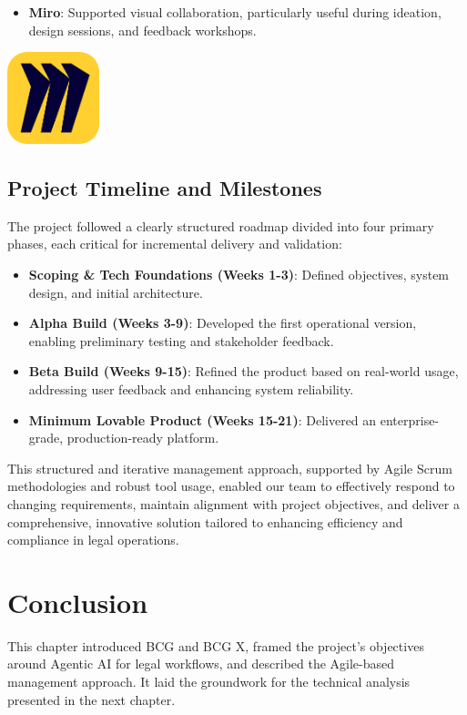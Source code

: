 \begin{itemize}
    \item \textbf{Miro}: Supported visual collaboration, particularly useful during ideation, design sessions, and feedback workshops.
\end{itemize}

\begin{center}
    \centering
    \includegraphics[width=0.2\textwidth]{Images/Miro Logo.png}
     \cite{miro_logo}
    \label{fig:miro_logo}
\end{center}

\subsection{Project Timeline and Milestones}
The project followed a clearly structured roadmap divided into four primary phases, each critical for incremental delivery and validation:

\begin{itemize}
    \item \textbf{Scoping \& Tech Foundations (Weeks 1-3)}: Defined objectives, system design, and initial architecture.
    \item \textbf{Alpha Build (Weeks 3-9)}: Developed the first operational version, enabling preliminary testing and stakeholder feedback.
    \item \textbf{Beta Build (Weeks 9-15)}: Refined the product based on real-world usage, addressing user feedback and enhancing system reliability.
    \item \textbf{Minimum Lovable Product (Weeks 15-21)}: Delivered an enterprise-grade, production-ready platform.
\end{itemize}

This structured and iterative management approach, supported by Agile Scrum methodologies and robust tool usage, enabled our team to effectively respond to changing requirements, maintain alignment with project objectives, and deliver a comprehensive, innovative solution tailored to enhancing efficiency and compliance in legal operations.


\section{Conclusion}
This chapter introduced BCG and BCG X, framed the project’s objectives around Agentic AI for legal workflows, and described the Agile-based management approach. It laid the groundwork for the technical analysis presented in the next chapter.